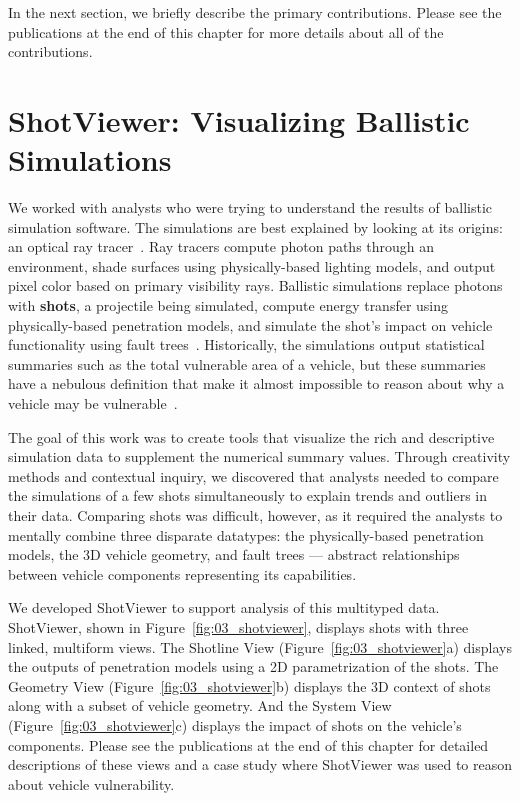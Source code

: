 In the next section, we briefly describe the primary contributions. Please see the publications at the end of this chapter for more details about all of the contributions. 

\section{ShotViewer: Visualizing Ballistic Simulations}

We worked with analysts who were trying to understand the results of ballistic simulation software. The simulations are best explained by looking at its origins: an optical ray tracer~\cite{Butler2007}. Ray tracers compute photon paths through an environment, shade surfaces using physically-based lighting models, and output pixel color based on primary visibility rays. Ballistic simulations replace photons with {\bf shots}, a projectile being simulated, compute energy transfer using physically-based penetration models, and simulate the shot's impact on vehicle functionality using fault trees~\cite{SURVICEEngineering2013}. Historically, the simulations output statistical summaries such as the total vulnerable area of a vehicle, but these summaries have a nebulous definition that make it almost impossible to reason about why a vehicle may be vulnerable~\cite{Guber1967}. 

The goal of this work was to create tools that visualize the rich and descriptive simulation data to supplement the numerical summary values. Through creativity methods and contextual inquiry, we discovered that analysts needed to compare the simulations of a few shots simultaneously to explain trends and outliers in their data. Comparing shots was difficult, however, as it required the analysts to mentally combine three disparate datatypes: the physically-based penetration models, the 3D vehicle geometry, and fault trees --- abstract relationships between vehicle components representing its capabilities.

We developed ShotViewer to support analysis of this multityped data. ShotViewer, shown in Figure~\ref{fig:03_shotviewer}, displays shots with three linked, multiform views. The Shotline View (Figure~\ref{fig:03_shotviewer}a) displays the outputs of penetration models using a 2D parametrization of the shots. The Geometry View (Figure~\ref{fig:03_shotviewer}b) displays the 3D context of shots along with a subset of vehicle geometry. And the System View (Figure~\ref{fig:03_shotviewer}c) displays the impact of shots on the vehicle's components. Please see the publications at the end of this chapter for detailed descriptions of these views and a case study where ShotViewer was used to reason about vehicle vulnerability.

